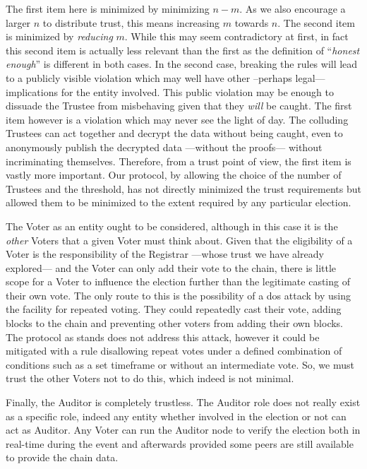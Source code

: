 The first item here is minimized by minimizing $n - m$. As we also encourage a larger $n$ to distribute trust, this means increasing $m$ towards $n$. The second item is minimized by \emph{reducing} $m$. While this may seem contradictory at first, in fact this second item is actually less relevant than the first as the definition of ``\emph{honest enough}'' is different in both cases. In the second case, breaking the rules will lead to a publicly visible violation which may well have other --perhaps legal--- implications for the entity involved. This public violation may be enough to dissuade the Trustee from misbehaving given that they \emph{will} be caught. The first item however is a violation which may never see the light of day. The colluding Trustees can act together and decrypt the data without being caught, even to anonymously publish the decrypted data ---without the proofs--- without incriminating themselves. Therefore, from a trust point of view, the first item is vastly more important. Our protocol, by allowing the choice of the number of Trustees and the threshold, has not directly minimized the trust requirements but allowed them to be minimized to the extent required by any particular election.

The Voter as an entity ought to be considered, although in this case it is the \emph{other} Voters that a given Voter must think about. Given that the eligibility of a Voter is the responsibility of the Registrar ---whose trust we have already explored--- and the Voter can only add their vote to the chain, there is little scope for a Voter to influence the election further than the legitimate casting of their own vote. The only route to this is the possibility of a \gls{dos} attack by using the facility for repeated voting. They could repeatedly cast their vote, adding blocks to the chain and preventing other voters from adding their own blocks. The protocol as stands does not address this attack, however it could be mitigated with a rule disallowing repeat votes under a defined combination of conditions such as a set timeframe or without an intermediate vote. So, we must trust the other Voters not to do this, which indeed is not minimal.

Finally, the Auditor is completely trustless. The Auditor role does not really exist as a specific role, indeed any entity whether involved in the election or not can act as Auditor. Any Voter can run the Auditor node to verify the election both in real-time during the event and afterwards provided some peers are still available to provide the chain data.


